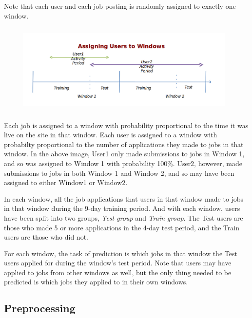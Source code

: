 \documentclass{article} %
\begin{document}
Note that each user and each job posting is randomly assigned to exactly one window.

\begin{figure}[h]
    \begin{center}
        \includegraphics[width=4.3in,height=1.8in]{./fig/assignusertowindows.png}
        \caption{}
    \end{center}
\end{figure}

Each job is assigned to a window with probability proportional to the time it
was live on the site in that window. Each user is assigned to a window with
probabilty proportional to the number of applications they made to jobs in
that window. In the above image, User1 only made submissions to jobs in
Window 1, and so was assigned to Window 1 with probability 100\%. User2,
however, made submissions to jobs in both Window 1 and Window 2, and so may
have been assigned to either Window1 or Window2.

In each window, all the job applications that users in that window made to
jobs in that window during the 9-day training period. 
And with each window, users have been split into two groups, {\it Test group}
and {\it Train group}. The Test users are those who made 5 or more
applications in the 4-day test period, and the Train users are those who did
not.

For each window, the task of prediction is which jobs in that window the Test
users applied for during the window's test period. Note that users may have
applied to jobs from other windows as well, but the only thing needed to be
predicted is which jobs they applied to in their own windows.




\subsection{Preprocessing} %
\end{document}
